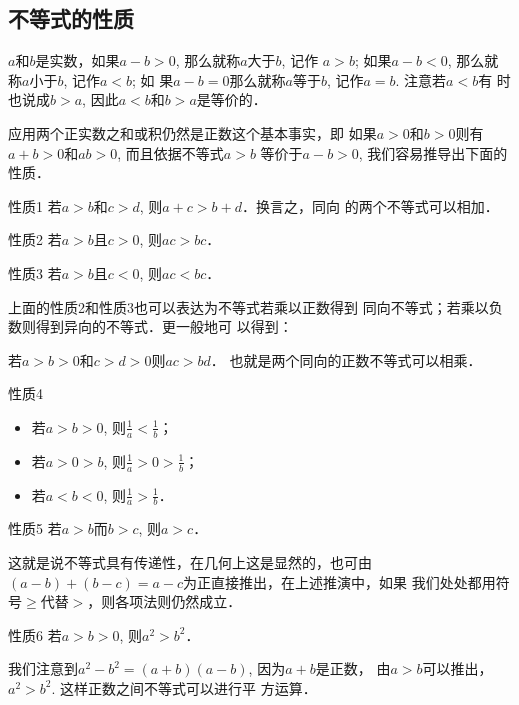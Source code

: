 \subsection{不等式的性质}
$a$和$b$是实数，如果$a-b>0$, 那么就称$a$大于$b$, 记作
$a>b$; 如果$a-b<0$, 那么就称$a$小于$b$, 记作$a<b$; 如
果$a-b=0$那么就称$a$等于$b$, 记作$a=b$. 注意若$a<b$有
时也说成$b>a$, 因此$a<b$和$b>a$是等价的．

应用两个正实数之和或积仍然是正数这个基本事实，即
如果$a>0$和$b>0$则有$a+b>0$和$ab>0$, 而且依据不等式$a>b$
等价于$a-b>0$, 我们容易推导出下面的性质．

\begin{blk}{性质1}
    若$a>b$和$c>d$, 则$a+c>b+d$．换言之，同向
的两个不等式可以相加．
\end{blk}

\begin{blk}{性质2}
    若$a>b$且$c>0$, 则$ac>bc$．
\end{blk}

\begin{blk}{性质3}
    若$a>b$且$c<0$, 则$ac<bc$．
\end{blk}

上面的性质2和性质3也可以表达为不等式若乘以正数得到
同向不等式；若乘以负数则得到异向的不等式．更一般地可
以得到：

若$a>b>0$和$c>d>0$则$ac>bd$．
也就是两个同向的正数不等式可以相乘．


\begin{blk}{性质4}
    \begin{itemize}
        \item 若$a>b>0$, 则$\frac{1}{a}<\frac{1}{b}$；
        \item 若$a>0>b$, 则$\frac{1}{a}>0>\frac{1}{b}$；
        \item 若$a<b<0$, 则$\frac{1}{a}>\frac{1}{b}$．
    \end{itemize}
 \end{blk}   

\begin{blk}{性质5}
    若$a>b$而$b>c$, 则$a>c$．
\end{blk}

这就是说不等式具有传递性，在几何上这是显然的，也可由
 $(a-b)+(b-c)=a-c$为正直接推出，在上述推演中，如果
 我们处处都用符号$\ge $代替$>$，则各项法则仍然成立．

\begin{blk}{性质6}
    若$a>b>0$, 则$a^2>b^2$．
\end{blk}

我们注意到$a^2-b^2=(a+b)(a-b)$, 因为$a+b$是正数，
 由$a>b$可以推出，$a^2>b^2$. 这样正数之间不等式可以进行平
 方运算．

